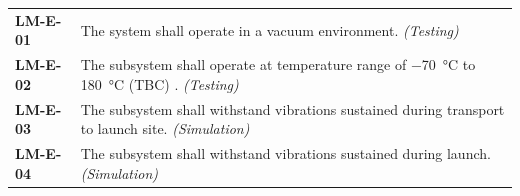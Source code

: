 \documentclass[12pt, letterpaper]{article}
\begin{document}
\vspace{-10pt}
\begin{longtable}{P{2cm}P{13.75cm}}
\textbf{LM-E-01}	& The system shall operate in a vacuum environment. \textit{(Testing)}													\\
\textbf{LM-E-02}	& The subsystem shall operate at temperature range of \SI{-70}{\degreeCelsius} to \SI{180}{\degreeCelsius} (TBC) \cite{NASAsysreq_Kumar}. \textit{(Testing)}										\\
\textbf{LM-E-03}	& The subsystem shall withstand vibrations sustained during transport to launch site. \textit{(Simulation)}		\\
\textbf{LM-E-04}	& The subsystem shall withstand vibrations sustained during launch. \textit{(Simulation)}						\\
\end{longtable}
\end{document}
